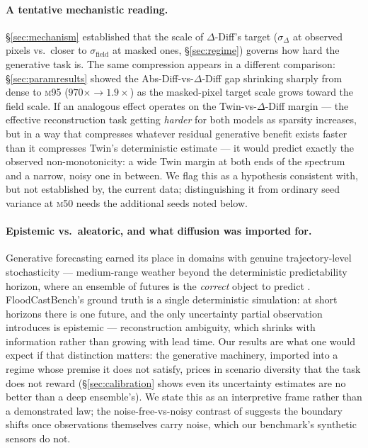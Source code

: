\documentclass[11pt]{article}
\newcommand{\ours}{\mbox{$\Delta$-Diff}}       %
\newcommand{\absdiff}{\mbox{Abs-Diff}}          %
\newcommand{\twin}{\mbox{Twin}}                 %
\newcommand{\mfifty}{\textsc{m50}}
\newcommand{\mninetyfive}{\textsc{m95}}
\begin{document}
\paragraph{A tentative mechanistic reading.} \S\ref{sec:mechanism}
established that the scale of \ours{}'s target ($\sigma_\Delta$ at
observed pixels vs.\ closer to $\sigma_{\text{field}}$ at masked ones,
\S\ref{sec:regime}) governs how hard the generative task is. The same
compression appears in a different comparison: \S\ref{sec:paramresults}
showed the \absdiff{}-vs-\ours{} gap shrinking sharply from dense to
\mninetyfive{} ($970\times \to 1.9\times$) as the masked-pixel target
scale grows toward the field scale. If an analogous effect operates on
the \twin{}-vs-\ours{} margin --- the effective reconstruction task
getting \emph{harder} for both models as sparsity increases, but in a way
that compresses whatever residual generative benefit exists faster than
it compresses \twin{}'s deterministic estimate --- it would predict
exactly the observed non-monotonicity: a wide \twin{} margin at both ends
of the spectrum and a narrow, noisy one in between. We flag this as a
hypothesis consistent with, but not established by, the current data;
distinguishing it from ordinary seed variance at \mfifty{} needs the
additional seeds noted below.

\paragraph{Epistemic vs.\ aleatoric, and what diffusion was imported for.}
Generative forecasting earned its place in domains with genuine
trajectory-level stochasticity --- medium-range weather beyond the
deterministic predictability horizon, where an ensemble of futures is the
\emph{correct} object to predict \citep{gencast2024}. FloodCastBench's
ground truth is a single deterministic simulation: at short horizons
there is one future, and the only uncertainty partial observation
introduces is epistemic --- reconstruction ambiguity, which shrinks with
information rather than growing with lead time. Our results are what one
would expect if that distinction matters: the generative machinery,
imported into a regime whose premise it does not satisfy, prices in
scenario diversity that the task does not reward
(\S\ref{sec:calibration} shows even its uncertainty estimates are no
better than a deep ensemble's). We state this as an interpretive frame
rather than a demonstrated law; the noise-free-vs-noisy contrast of
\citet{spatiallyawarediffusion2024} suggests the boundary shifts once
observations themselves carry noise, which our benchmark's synthetic
sensors do not.
\end{document}
